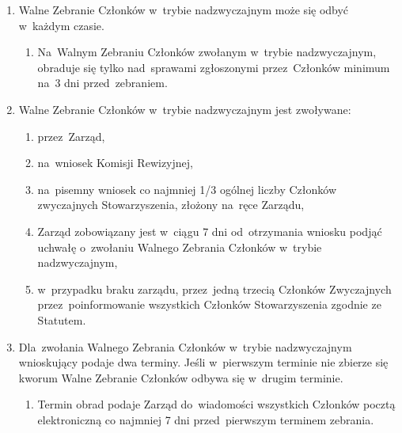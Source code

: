 \documentclass{article}
\begin{document}
\begin{enumerate}
      \begin{enumerate}
        \item Termin obrad Zarząd podaje do~wiadomości wszystkich Członków pocztą elektroniczną co najmniej 14 dni przed~pierwszym terminem zebrania.
        \item Aby Walne Zebranie Członków mogło się rozpocząć, w~pierwszym terminie wymagane jest kworum, czyli obecność co najmniej połowy ogólnej liczby zwyczajnych Członków Stowarzyszenia.
        \item W~drugim terminie kworum nie jest wymagane.
        \item Oba terminy Walnego Zebrania Członków w~trybie zwyczajnym muszą być odległe od~siebie przynajmniej 7, ale~nie bardziej niż 14 dni kalendarzowych.
      \end{enumerate}
    \item Walne Zebranie Członków w~trybie nadzwyczajnym może się odbyć w~każdym czasie.
      \begin{enumerate}
        \item Na~Walnym Zebraniu Członków zwołanym w~trybie nadzwyczajnym, obraduje się tylko nad~sprawami zgłoszonymi przez~Członków minimum na~3 dni przed~zebraniem.
      \end{enumerate}
    \item Walne Zebranie Członków w~trybie nadzwyczajnym jest zwoływane:
      \begin{enumerate}
        \item przez~Zarząd,
        \item na~wniosek Komisji Rewizyjnej,
        \item na~pisemny wniosek co najmniej 1/3 ogólnej liczby Członków zwyczajnych Stowarzyszenia, złożony na~ręce Zarządu,
        \item Zarząd zobowiązany jest w~ciągu 7 dni od~otrzymania wniosku podjąć uchwałę o~zwołaniu Walnego Zebrania Członków w~trybie nadzwyczajnym,
        \item w~przypadku braku zarządu, przez~jedną trzecią Członków Zwyczajnych przez~poinformowanie wszystkich Członków Stowarzyszenia zgodnie ze Statutem.
        \end{enumerate}
    \item Dla~zwołania Walnego Zebrania Członków w~trybie nadzwyczajnym wnioskujący podaje dwa terminy. Jeśli w~pierwszym terminie nie zbierze się kworum Walne Zebranie Członków odbywa się w~drugim terminie.
      \begin{enumerate}
        \item Termin obrad podaje Zarząd do~wiadomości wszystkich Członków pocztą elektroniczną co najmniej 7 dni przed~pierwszym terminem zebrania.

\end{enumerate}
\end{enumerate}
\end{document}
